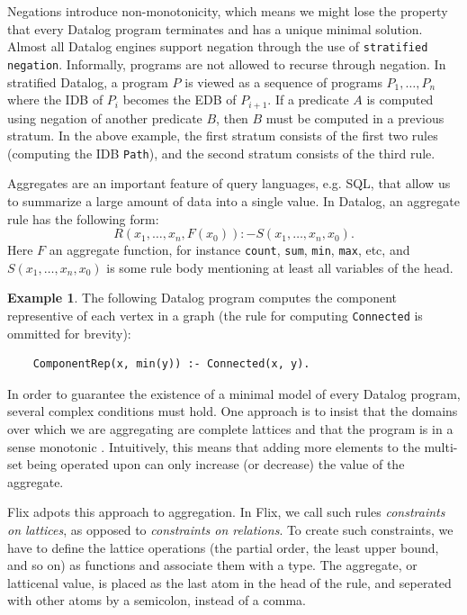 \documentclass[11pt]{report}
\theoremstyle{definition}
\newtheorem{exmp}{Example}[chapter]
\begin{document}
Negations introduce non-monotonicity, which means we might lose the property that every Datalog program terminates and has a unique minimal solution. Almost all Datalog engines support negation through the use of \texttt{stratified negation}. Informally, programs are not allowed to recurse through negation. In stratified Datalog, a program $P$ is viewed as a sequence of programs $P_1, \ldots, P_n$ where the IDB of $P_i$ becomes the EDB of $P_{i+1}$. If a predicate $A$ is computed using negation of another predicate $B$, then $B$ must be computed in a previous stratum. In the above example, the first stratum consists of the first two rules (computing the IDB \texttt{Path}), and the second stratum consists of the third rule.

Aggregates are an important feature of query languages, e.g. SQL, that allow us to summarize a large amount of data into a single value. In Datalog, an aggregate rule has the following form:
$$R(x_1, \ldots, x_n, F(x_0)) :- S(x_1, \ldots, x_n, x_0).$$
Here $F$ an aggregate function, for instance \texttt{count}, \texttt{sum}, \texttt{min}, \texttt{max}, etc, and $S(x_1, \ldots, x_n, x_0)$ is some rule body mentioning at least all variables of the head.

\begin{exmp}
  The following Datalog program computes the component representive of each vertex in a graph (the rule for computing \texttt{Connected} is ommitted for brevity):

  \begin{verbatim}
    ComponentRep(x, min(y)) :- Connected(x, y).
  \end{verbatim}
\end{exmp}

In order to guarantee the existence of a minimal model of every Datalog program, several complex conditions must hold. One approach is to insist that the domains over which we are aggregating are complete lattices and that the program is in a sense monotonic \cite{ROSS199779}. Intuitively, this means that adding more elements to the multi-set being operated upon can only increase (or decrease) the value of the aggregate.

Flix adpots this approach to aggregation. In Flix, we call such rules \textit{constraints on lattices}, as opposed to \textit{constraints on relations}. To create such constraints, we have to define the lattice operations (the partial order, the least upper bound, and so on) as functions and associate them with a type. The aggregate, or latticenal value, is placed as the last atom in the head of the rule, and seperated with other atoms by a semicolon, instead of a comma.
\end{document}
